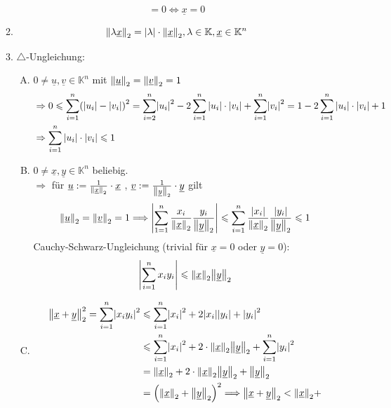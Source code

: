 \begin{enumerate}[(i)]
\begin{enumerate}[1.]
\[			 = 0 \Leftrightarrow \underline{x}=0
		\] 
		\item \[
			\norm[2]{\lambda \underline{x}} = \abs*{\lambda } \cdot \norm[2]{\underline{x}}, \lambda \in \mathds{K} , \underline{x} \in \mathds{K}^n   
		\]
		\item $\triangle$-Ungleichung: \\
		\begin{enumerate}[A.]
			\item $0 \not= \underline{u}, \underline{v} \in \mathds{K}^n$ mit $\norm[2]{\underline{u}} = \norm[2]{\underline{v}}=1  $
			\begin{align*}
				&\Rightarrow 0 \le \sum_{i=1}^{n} \enbrace*{|u_i| - |v_i|}^2 
				= \sum_{i=2}^{n} \abs*{u_i}^2 - 2 \sum_{i=1}^{n} |u_i| \cdot |v_i| + \sum_{i=1}^{n} \abs*{v_i}^2 
			 	= 1 - 2 \sum_{i=1}^{n}  |u_i| \cdot |v_i| +1 \\
				&\Rightarrow \sum_{i=1}^{n}  |u_i| \cdot |v_i| \le 1
			\end{align*}
		\item $0 \not= \underline{x}, \underline{y} \in \mathds{K}^n$ beliebig. \\
		$\Rightarrow $ für $\underline{u} := \frac{1}{\norm[2]{\underline{x}} } \cdot \underline{x} $ , $\underline{v} 
		:= \frac{1}{\norm[2]{\underline{y}} } \cdot \underline{y} $ gilt
		\[
			\norm[2]{\underline{u}} = \norm[2]{\underline{v}} = 1 \Longrightarrow \abs*{\sum_{1=1}^{n} \frac{x_i}{\norm[2]{\underline{x}} } 
			\frac{y_i}{\norm[2]{\underline{y}} }  } \le \sum_{i=1}^{n} \frac{\abs*{x_i}}{\norm[2]{\underline{x}} }  \frac{|y_i|}{\norm[2]{\underline{y}} } \le 1 
		\]
		Cauchy-Schwarz-Ungleichung (trivial für $\underline{x}=0$ oder $\underline{y}=0$):
		\[
			\abs*{\sum_{i=1}^{n} x_i y_i} \le \norm[2]{\underline{x}} \norm[2]{\underline{y}}   
		\]
		\item 
		\begin{align*}
			\norm[2]{\underline{x} + \underline{y}}^2 = \sum_{i=1}^{n} \abs*{x_i y_i}^2 &\le \sum_{i=1}^{n} \abs*{x_i}^2 + 2 \abs*{x_i}\abs*{y_i} + \abs*{y_i}^2 \\
			&\le \sum_{i=1}^{n} \abs*{x_i}^2 + 2 \cdot  \norm[2]{\underline{x}} \norm[2]{\underline{y}} + \sum_{i=1}^{n} \abs*{y_i}^2 \\
			&= \norm[2]{\underline{x}} + 2 \cdot  \norm[2]{\underline{x}} \norm[2]{\underline{y}} + \norm[2]{\underline{y}} \\
			&= \enbrace*{\norm[2]{\underline{x}} + \norm[2]{\underline{y}}  }^2 \Longrightarrow \norm[2]{\underline{x} + \underline{y}} < \norm[2]{\underline{x}} + 

\end{align*}
\end{enumerate}
\end{enumerate}
\end{enumerate}
